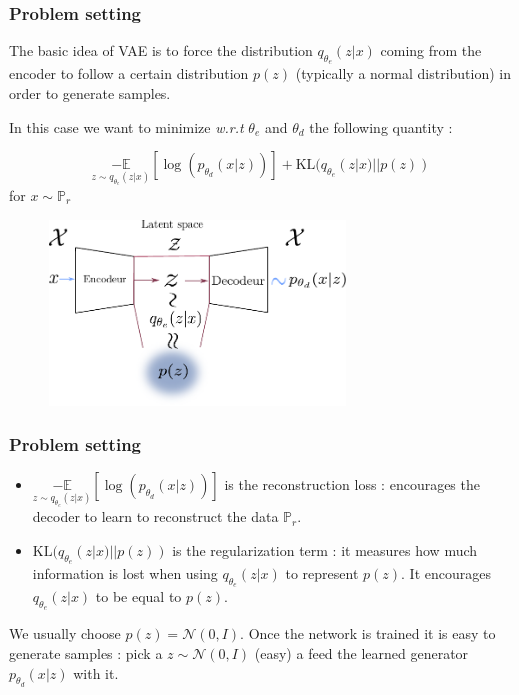 \documentclass[french,9pt]{beamer}
\begin{document}
\begin{frame}
\frametitle{Problem setting}

The basic idea of VAE is to force the distribution $q_{\theta_{e}}(z|x)$ coming from the encoder to follow a certain distribution $p(z)$ (typically a normal distribution) in order to generate samples.

In this case we want to minimize \textit{w.r.t} $\theta_{e}$ and $\theta_{d}$ the following quantity  :

\begin{equation}
\label{vaeeq}
 \underset{}{} \underset{z \sim q_{\theta_{e}}(z|x)}{-\mathbb{E}}[\log(p_{\theta_{d}}(x|z))] + \text{KL}(q_{\theta_{e}}(z|x) || p(z))
\end{equation}
for  $x \sim \mathbb{P}_{r}$

\begin{figure}
  \begin{center}
    \includegraphics[width=0.7\textwidth]{fig/vae.pdf}
  \end{center}
\end{figure}

\end{frame}


\begin{frame}
\frametitle{Problem setting}


\begin{itemize}
\item $\underset{z \sim q_{\theta_{e}}(z|x)}{-\mathbb{E}}[\log(p_{\theta_{d}}(x|z))]$ is the reconstruction loss : encourages the decoder to learn to reconstruct the data $\mathbb{P}_{r}$.
\item $\text{KL}(q_{\theta_{e}}(z|x) || p(z))$ is the regularization term : it measures how much information is lost when using $q_{\theta_{e}}(z|x)$ to represent $p(z)$. It encourages $q_{\theta_{e}}(z|x)$ to be equal to $p(z)$.
\end{itemize}

We usually choose $p(z)=\mathcal{N}(0,I)$. Once the network is trained it is easy to generate samples : pick a $z\sim \mathcal{N}(0,I)$ (easy) a feed the learned generator $p_{\theta_{d}}(x|z)$ with it.

\end{frame}
\end{document}
